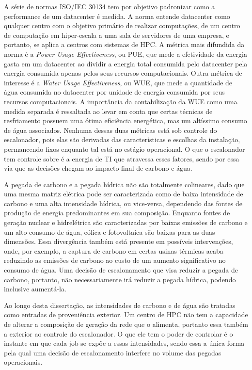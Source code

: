 A série de normas ISO/IEC 30134 tem por objetivo padronizar como a performance de um datacenter é medida.
A norma entende datacenter como qualquer centro com o objetivo primário de realizar computações, de um centro
de computação em hiper-escala a uma sala de servidores de uma empresa, e portanto, se aplica a centros 
com sistemas de HPC. A métrica mais difundida da norma é a \emph{Power Usage Effectiveness}, ou PUE, que mede
a efetividade da energia gasta em um datacenter ao dividir a energia total consumida pelo datacenter pela energia
consumida apenas pelos seus recursos computacionais. Outra métrica de interesse é a \emph{Water Usage Effectiveness}, ou WUE,
que mede a quantidade de água consumida no datacenter por unidade de energia consumida por seus recursos computacionais.
A importância da contabilização da WUE como uma medida separada é ressaltada ao levar em conta que certas técnicas
de resfriamento possuem uma ótima eficiência energética, mas um altíssimo consumo de água associados. Nenhuma dessas
duas métricas está sob controle do escalonador, pois elas são derivadas das características e escolhas da instalação,
permancendo fixos enquanto tal está no estágio operacional. O que o escalonador tem controle sobre é a energia de 
TI que atravessa esses fatores, sendo por essa via que as decisões chegam ao impacto final de carbono e água.

A pegada de carbono e a pegada hídrica não são totalmente colineares, dado que uma mesma matriz elétrica
pode ser caracterizada como de baixa intensidade de carbono e uma alta intensidade hídrica, ou vice-versa,
dependendo das fontes de produção de energia predominantes em sua composição. Enquanto fontes de geração
nuclear e hidrelétrica são caracterizadas por baixas emissões de carbono e um alto consumo de água,
eólica e fotovoltaica são baixas para as duas dimensões. Essa divergência também está presente em possíveis
intervenções, onde, por exemplo, a captura de carbono em certas usinas térmicas acaba reduzindo as emissões de carbono
ao custo de um aumento significativo no consumo de água. Uma decisão de escalonamento que visa reduzir a pegada
de carbono, portanto, não necessariamente irá reduzir a pegada hídrica, podendo inclusive aumentá-la.

Ao longo desta dissertação, as intensidades de carbono e de água são tratadas como entradas de proveniência
exterior. Um centro de HPC não tem a capacidade de alterar a composição de geração da rede que o alimenta,
portanto essa também a exterior ao controle do escalonador. O que ele tem o poder de controlar é o instante
em que cada job se expõe a essas intensidades, sendo essa a única forma pela qual uma decisão de escalonamento
interfere no volume das pegadas operacionais.

